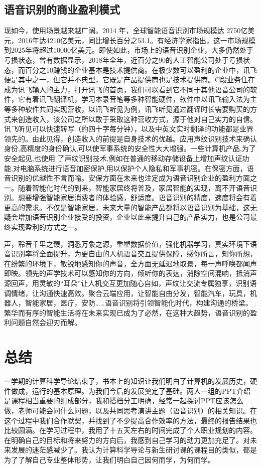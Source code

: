 \documentclass{article}
\begin{document}
\subsection{语音识别的商业盈利模式}
现如今，使用场景越来越广阔。2014 年，全球智能语音识别市场规模达 2750亿美元，2016年达4210亿美元，同比增长百分之53.1。有经济学家指出，这一市场规模到2025年将超过10000亿美元。即使如此，市场上的语音识别企业，大多仍然处于亏损状态，曾有数据显示，2018年全年，近百分之90的人工智能公司处于亏损状态，而百分之10赚钱的企业基本是技术提供商。在极少数可以盈利的企业中，讯飞便是其中之一，但它并不典型，它既是产品提供商也是技术提供商。C段业务住在成为讯飞输入的主力，打开讯飞的首页，我们可以看到它不同于其他语音公司的软件，它有着讯飞翻译机，学习本录音笔等多种智能硬件，软件中以讯飞输入法为主等多种软件共同实现营收，以讯飞听见为例，讯飞听见通过翻译时长需要购买的方式来创造收入，该公司之所以敢于采取这种营收方式，源于他对自己实力的自信。讯飞听见可以快速转写（约四十字每分钟），以及中英文实时翻译的功能都是业界领先的。由此见得，创造收入的前提是自身技术的优越。应用声纹识别技术来确认身份,高精度的身份确认,可以使军事系统的安全性大大增强。一些计算机产品,为了安全起见,也使用 了声纹识别技术,例如在普通的移动存储设备上增加声纹认证功能,对电脑系统进行语音加密保护,用以保护个人隐私和军事机密。在保密方面，语音识别的优越性不言而喻。安保方面在未来也注定成为语音识别企业的盈利方面之一。随着智能化时代的到来，智能家居终将普及，家居智能的实现，离不开语音识别。想要增强智能家居消费者的体验感，舒适度。语音识别的精度，速度将会有着更高的需求。不仅是智能家居，未来大量的智能产品都将以语音识别为基础，这无疑会增加语音识别企业接受的投资，企业以此来提升自己的产品实力，也是公司最终实现盈利的方式之一。\par
声，聆音千里之臻，洞悉万象之源，重塑数据价值，强化机器学习，真实环境下语音识别率将全面提升，为更自由的人机语音交互提供保障，感你所言，知你所想，在纷繁的环境下，敏锐地感知你的声音，全方面无延迟地取景，每一声呼唤都闻声即映。领先的声学技术可以感知你的方向，倾听你的表达，消除空间混响，抵消声源回声，用灵敏的“耳朵”让人机交互更加随心自如，声纹让交流专属独享，识别语调情绪，让沟通快速高效。聚合云端应用，让智能自由分发，智能汽车，玩具，机器人，智能家居，医疗，安防……语音识别将引领智能化时代，构建沟通的桥梁。繁华而有序的智能生活将在未来实现已成为了必然，在这种大趋势，语音识别的盈利问题自然会迎刃而解。
\section{总结}
一学期的计算科学导论结束了，书本上的知识让我们明白了计算机的发展历史，硬件做成，运行的基本原理。为我们今后的发展奠定了基础。两人一组的PPT介绍是课程相当重要的组成部分，我和搭档分工明确，经常一起探讨PPT应该怎么做，老师可能会问什么问题，以及共同思考演讲主题（语音识别）的相关知识。在这个过程中我们合作默契，并找到了不少提高合作效率的方法，最终的报告结果也比较圆满。在学习过程中，我用了十五天左右的时间完成了个人职业规划的内容。在明确自己的目标和将来努力的方向后，我感到自己学习的动力更加充足了。对未来发展的迷茫感减少了。我认为计算科学导论与新生研讨课的课程目的类似，都是为了了解自己专业整体形势，让我们明白自己因何而学，为何而学。\newpage
\newpage
\end{document}
